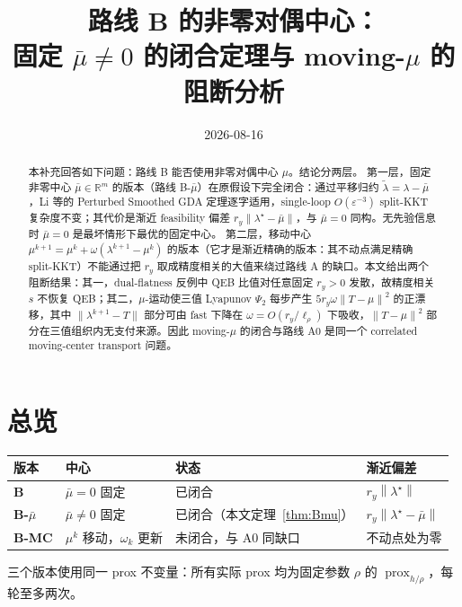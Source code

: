 \documentclass[11pt,a4paper,UTF8]{ctexart}
\title{\bfseries 路线 B 的非零对偶中心：\\固定 $\bar\mu\neq0$ 的闭合定理与 moving-$\mu$ 的阻断分析}
\date{2026-08-16}
\newcommand{\R}{\mathbb{R}}
\newcommand{\eps}{\varepsilon}
\newcommand{\prox}{\operatorname{prox}}
\newcommand{\norm}[1]{\left\|#1\right\|}
\begin{document}
\maketitle

\begin{abstract}
本补充回答如下问题：路线 B 能否使用非零对偶中心 $\mu$。结论分两层。
第一层，固定非零中心 $\bar\mu\in\R^m$ 的版本（路线 B-$\bar\mu$）在原假设下完全闭合：通过平移归约 $\tilde\lambda=\lambda-\bar\mu$，Li 等的 Perturbed Smoothed GDA 定理逐字适用，single-loop $O(\eps^{-3})$ split-KKT 复杂度不变；其代价是渐近 feasibility 偏差 $r_y\|\lambda^\star-\bar\mu\|$，与 $\bar\mu=0$ 同构。无先验信息时 $\bar\mu=0$ 是最坏情形下最优的固定中心。
第二层，移动中心 $\mu^{k+1}=\mu^k+\omega(\lambda^{k+1}-\mu^k)$ 的版本（它才是渐近精确的版本：其不动点满足精确 split-KKT）不能通过把 $r_y$ 取成精度相关的大值来绕过路线 A 的缺口。本文给出两个阻断结果：其一，dual-flatness 反例中 QEB 比值对任意固定 $r_y>0$ 发散，故精度相关 $s$ 不恢复 QEB；其二，$\mu$-运动使三值 Lyapunov $\Psi_2$ 每步产生 $5r_y\omega\norm{T-\mu}^2$ 的正漂移，其中 $\|\lambda^{k+1}-T\|$ 部分可由 fast 下降在 $\omega=O(r_y/\ell_\rho)$ 下吸收，$\norm{T-\mu}^2$ 部分在三值组织内无支付来源。因此 moving-$\mu$ 的闭合与路线 A0 是同一个 correlated moving-center transport 问题。
\end{abstract}

\tableofcontents

\section{总览}

\begin{center}
\renewcommand{\arraystretch}{1.35}
\begin{tabularx}{\textwidth}{>{\bfseries}p{}p{}XX}
\toprule
版本 & 中心 & 状态 & 渐近偏差 \\
\midrule
B & $\bar\mu=0$ 固定 & 已闭合 & $r_y\norm{\lambda^\star}$ \\
B-$\bar\mu$ & $\bar\mu\neq0$ 固定 & 已闭合（本文定理~\ref{thm:Bmu}） & $r_y\norm{\lambda^\star-\bar\mu}$ \\
B-MC & $\mu^k$ 移动，$\omega_k$ 更新 & 未闭合，与 A0 同缺口 & 不动点处为零 \\
\bottomrule
\end{tabularx}
\end{center}

三个版本使用同一 prox 不变量：所有实际 prox 均为固定参数 $\rho$ 的 $\prox_{h/\rho}$，每轮至多两次。
\end{document}

